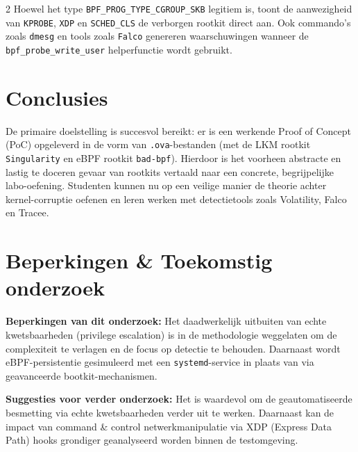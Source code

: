 \documentclass[a0,portrait]{hogent-poster}
\begin{document}
\begin{multicols}{2}
        Hoewel het type \texttt{BPF\_PROG\_TYPE\_CGROUP\_SKB} legitiem is, toont de aanwezigheid van \texttt{KPROBE}, \texttt{XDP} en \texttt{SCHED\_CLS} de verborgen rootkit direct aan. Ook commando's zoals \texttt{dmesg} en tools zoals \texttt{Falco} genereren waarschuwingen wanneer de \texttt{bpf\_probe\_write\_user} helperfunctie wordt gebruikt.
        
        \section{Conclusies}
        De primaire doelstelling is succesvol bereikt: er is een werkende Proof of Concept (PoC) opgeleverd in de vorm van \texttt{.ova}-bestanden (met de LKM rootkit \texttt{Singularity} en eBPF rootkit \texttt{bad-bpf}). Hierdoor is het voorheen abstracte en lastig te doceren gevaar van rootkits vertaald naar een concrete, begrijpelijke labo-oefening. Studenten kunnen nu op een veilige manier de theorie achter kernel-corruptie oefenen en leren werken met detectietools zoals Volatility, Falco en Tracee.
        
        \section{Beperkingen \& Toekomstig onderzoek}
        \textbf{Beperkingen van dit onderzoek:} Het daadwerkelijk uitbuiten van echte kwetsbaarheden (privilege escalation) is in de methodologie weggelaten om de complexiteit te verlagen en de focus op detectie te behouden. Daarnaast wordt eBPF-persistentie gesimuleerd met een \texttt{systemd}-service in plaats van via geavanceerde bootkit-mechanismen.
        
        \textbf{Suggesties voor verder onderzoek:} Het is waardevol om de geautomatiseerde besmetting via echte kwetsbaarheden verder uit te werken. Daarnaast kan de impact van command \& control netwerkmanipulatie via XDP (Express Data Path) hooks grondiger geanalyseerd worden binnen de testomgeving.
        
    \end{multicols}
\end{document}
